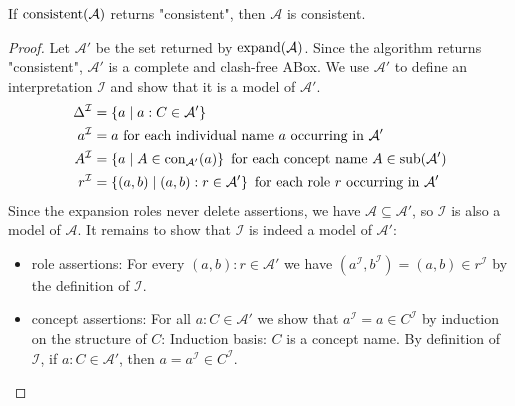 \begin{lemma}[Soundness]\label{lem:4.5}
	If $\operatorname{\text{consistent}}(\mathcal{A})$ returns "consistent", then $\mathcal{A}$ is consistent.
\end{lemma}
\begin{proof}
	Let $\mathcal{A}'$ be the set returned by $\operatorname{\text{expand}}(\mathcal{A})$.
	Since the algorithm returns "consistent", $\mathcal{A}'$ is a complete and clash-free ABox.
	We use $\mathcal{A}'$ to define an interpretation $\mathcal{I}$ and show that it is a model of $\mathcal{A}'$.
	\begin{align*}
		\Delta^\mathcal{I} &= \left\{ a \mid a:C \in \mathcal{A}' \right\}\\
		a^\mathcal{I} &= a \text{ for each individual name $a$ occurring in $\mathcal{A}'$} \\
		A^\mathcal{I} &= \left\{ a \mid A \in \operatorname{\text{con}}_{\mathcal{A}'}(a) \right\} \text{ for each concept name } A \in \operatorname{\text{sub}}(\mathcal{A'}) \\
		r^\mathcal{I} &= \left\{ (a,b) \mid (a,b):r \in \mathcal{A}' \right\} \text{ for each role $r$ occurring in $\mathcal{A}'$}
	\end{align*}
	Since the expansion roles never delete assertions, we have $\mathcal{A} \subseteq \mathcal{A}'$, so $\mathcal{I}$ is also a model of $\mathcal{A}$.
	It remains to show that $\mathcal{I}$ is indeed a model of $\mathcal{A}'$:
	\begin{itemize}
		\item role assertions: For every $(a,b) : r \in \mathcal{A}'$ we have $(a^\mathcal{I},b^\mathcal{I}) = (a,b) \in r^\mathcal{I}$ by the definition of $\mathcal{I}$.
		\item concept assertions: For all $a : C \in \mathcal{A}'$ we show that $a^\mathcal{I} = a \in C^\mathcal{I}$ by induction on the structure of $C$:
			\newline
			Induction basis: $C$ is a concept name.
			By definition of $\mathcal{I}$, if $a : C \in \mathcal{A}'$, then $a = a^\mathcal{I} \in C^\mathcal{I}$.


\end{itemize}
\end{proof}

